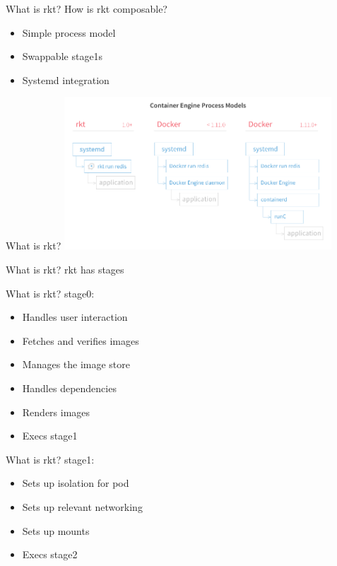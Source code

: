 \documentclass[pdf,aspectratio=169,14pt]{beamer}
\begin{document}


\begin{frame}{What is rkt?}
    How is rkt composable?
    \begin{itemize}
        \item<2-> Simple process model
        \item<3-> Swappable stage1s
        \item<4-> Systemd integration
    \end{itemize}
\end{frame}

\begin{frame}{What is rkt?}
    \center \includegraphics[width=0.75\textwidth]{rkt-vs-docker-process-model}
\end{frame}

\begin{frame}{What is rkt?}
    rkt has stages
\end{frame}

\begin{frame}{What is rkt?}
    stage0:
    \begin{itemize}
        \item<2-> Handles user interaction
        \item<3-> Fetches and verifies images
        \item<4-> Manages the image store
        \item<5-> Handles dependencies
        \item<6-> Renders images
        \item<7-> Execs stage1
    \end{itemize}
\end{frame}

\begin{frame}{What is rkt?}
    stage1:
    \begin{itemize}
        \item<2-> Sets up isolation for pod
        \item<3-> Sets up relevant networking
        \item<4-> Sets up mounts
        \item<5-> Execs stage2
    \end{itemize}
\end{frame}
\end{document}
